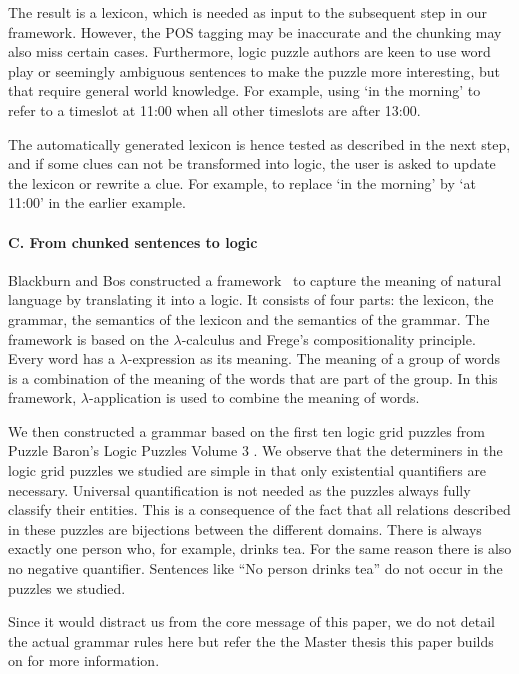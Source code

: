 The result is a lexicon, which is needed as input to the subsequent step in our framework. However, the POS tagging may be inaccurate and the chunking may also miss certain cases. Furthermore, logic puzzle authors are keen to use word play or seemingly ambiguous sentences to make the puzzle more interesting, but that require general world knowledge. For example, using `in the morning' to refer to a timeslot at 11:00 when all other timeslots are after 13:00.

The automatically generated lexicon is hence tested as described in the next step, and if some clues can not be transformed into logic, the user is asked to update the lexicon or rewrite a clue. For example, to replace `in the morning' by `at 11:00' in the earlier example.


\paragraph{C. From chunked sentences to logic}

Blackburn and Bos constructed a framework~\cite{Blackburn2005,Blackburn2006} to capture the meaning of natural language by translating it into a logic. It consists of four parts: the lexicon, the grammar, the semantics of the lexicon and the semantics of the grammar. The framework is based on the $\lambda$-calculus and Frege's compositionality principle. Every word has a $\lambda$-expression as its meaning. The meaning of a group of words is a combination of the meaning of the words that are part of the group. In this framework, $\lambda$-application is used to combine the meaning of words.

We then constructed a grammar based on the first ten logic grid puzzles from Puzzle Baron's Logic Puzzles Volume 3 \cite{logigrammen}. We observe that the determiners in the logic grid puzzles we studied are simple in that only existential quantifiers are necessary. Universal quantification is not needed as the puzzles always fully classify their entities. This is a consequence of the fact that all relations described in these puzzles are bijections between the different domains. There is always exactly one person who, for example, drinks tea. For the same reason there is also no negative quantifier. Sentences like ``No person drinks tea'' do not occur in the puzzles we studied.

Since it would distract us from the core message of this paper, we do not detail the actual grammar rules here but refer the the Master thesis this paper builds on \cite{msc/Claes17} for more information. 

